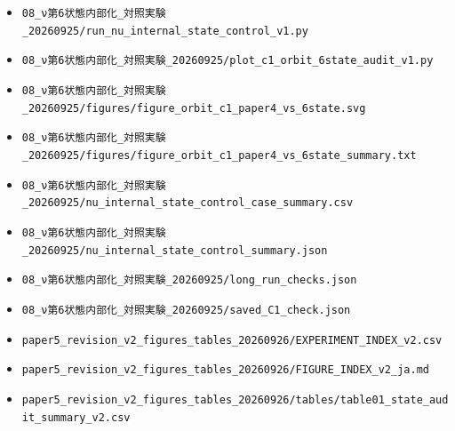 \documentclass[
  a4paper,
]{ltjsarticle}
\providecommand{\tightlist}{%
  \setlength{\itemsep}{0pt}\setlength{\parskip}{0pt}}
\begin{document}
\begin{itemize}
\tightlist
\item
  \texttt{08\_\allowbreak{}ν第6状態内部化\_\allowbreak{}対照実験\_\allowbreak{}20260925/\allowbreak{}run\_\allowbreak{}nu\_\allowbreak{}internal\_\allowbreak{}state\_\allowbreak{}control\_\allowbreak{}v1.py}
\item
  \texttt{08\_\allowbreak{}ν第6状態内部化\_\allowbreak{}対照実験\_\allowbreak{}20260925/\allowbreak{}plot\_\allowbreak{}c1\_\allowbreak{}orbit\_\allowbreak{}6state\_\allowbreak{}audit\_\allowbreak{}v1.py}
\item
  \texttt{08\_\allowbreak{}ν第6状態内部化\_\allowbreak{}対照実験\_\allowbreak{}20260925/\allowbreak{}figures/\allowbreak{}figure\_\allowbreak{}orbit\_\allowbreak{}c1\_\allowbreak{}paper4\_\allowbreak{}vs\_\allowbreak{}6state.svg}
\item
  \texttt{08\_\allowbreak{}ν第6状態内部化\_\allowbreak{}対照実験\_\allowbreak{}20260925/\allowbreak{}figures/\allowbreak{}figure\_\allowbreak{}orbit\_\allowbreak{}c1\_\allowbreak{}paper4\_\allowbreak{}vs\_\allowbreak{}6state\_\allowbreak{}summary.txt}
\item
  \texttt{08\_\allowbreak{}ν第6状態内部化\_\allowbreak{}対照実験\_\allowbreak{}20260925/\allowbreak{}nu\_\allowbreak{}internal\_\allowbreak{}state\_\allowbreak{}control\_\allowbreak{}case\_\allowbreak{}summary.csv}
\item
  \texttt{08\_\allowbreak{}ν第6状態内部化\_\allowbreak{}対照実験\_\allowbreak{}20260925/\allowbreak{}nu\_\allowbreak{}internal\_\allowbreak{}state\_\allowbreak{}control\_\allowbreak{}summary.json}
\item
  \texttt{08\_\allowbreak{}ν第6状態内部化\_\allowbreak{}対照実験\_\allowbreak{}20260925/\allowbreak{}long\_\allowbreak{}run\_\allowbreak{}checks.json}
\item
  \texttt{08\_\allowbreak{}ν第6状態内部化\_\allowbreak{}対照実験\_\allowbreak{}20260925/\allowbreak{}saved\_\allowbreak{}C1\_\allowbreak{}check.json}
\item
  \texttt{paper5\_\allowbreak{}revision\_\allowbreak{}v2\_\allowbreak{}figures\_\allowbreak{}tables\_\allowbreak{}20260926/\allowbreak{}EXPERIMENT\_\allowbreak{}INDEX\_\allowbreak{}v2.csv}
\item
  \texttt{paper5\_\allowbreak{}revision\_\allowbreak{}v2\_\allowbreak{}figures\_\allowbreak{}tables\_\allowbreak{}20260926/\allowbreak{}FIGURE\_\allowbreak{}INDEX\_\allowbreak{}v2\_\allowbreak{}ja.md}
\item
  \texttt{paper5\_\allowbreak{}revision\_\allowbreak{}v2\_\allowbreak{}figures\_\allowbreak{}tables\_\allowbreak{}20260926/\allowbreak{}tables/\allowbreak{}table01\_\allowbreak{}state\_\allowbreak{}audit\_\allowbreak{}summary\_\allowbreak{}v2.csv}

\end{itemize}
\end{document}
